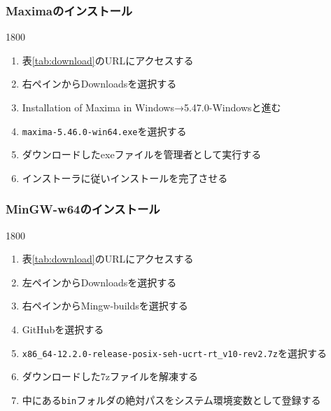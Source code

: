 \subsubsection{Maximaのインストール}
\begin{layer}{180}{0}
\end{layer}
\begin{enumerate}
    \item 表\ref{tab:download}のURLにアクセスする
    \item 右ペインからDownloadsを選択する
    \item Installation of Maxima in Windows→5.47.0-Windowsと進む
    \item \verb|maxima-5.46.0-win64.exe|を選択する
    \item ダウンロードしたexeファイルを管理者として実行する
    \item インストーラに従いインストールを完了させる
\end{enumerate}

\subsubsection{MinGW-w64のインストール}
\begin{layer}{180}{0}
\end{layer}
\begin{enumerate}
    \item 表\ref{tab:download}のURLにアクセスする
    \item 左ペインからDownloadsを選択する
    \item 右ペインからMingw-buildsを選択する
    \item GitHubを選択する
    \item \verb|x86_64-12.2.0-release-posix-seh-ucrt-rt_v10-rev2.7z|を選択する
    \item ダウンロードした7zファイルを解凍する
    \item 中にある\verb|bin|フォルダの絶対パスをシステム環境変数として登録する
\end{enumerate}

